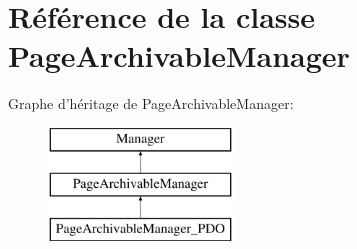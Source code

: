 \hypertarget{class_library_1_1_models_1_1_page_archivable_manager}{\section{Référence de la classe Page\+Archivable\+Manager}
\label{class_library_1_1_models_1_1_page_archivable_manager}
}
Graphe d'héritage de Page\+Archivable\+Manager\+:\begin{figure}[H]
\begin{center}
\leavevmode
\includegraphics[height=3.000000cm]{class_library_1_1_models_1_1_page_archivable_manager}
\end{center}
\end{figure}
